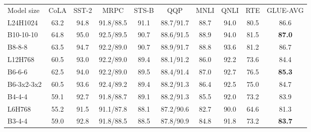 \documentclass{article}
\theoremstyle{custom}
\begin{document}
\begin{table}[!ht]
\centering
\small
\begin{tabular}{@{}lccccccccc@{}}
	\toprule
	Model size & CoLA & SST-2 & MRPC & STS-B & QQP & MNLI & QNLI & RTE & GLUE-AVG \\
	\cmidrule(r){1-1} \cmidrule(lr){2-9} \cmidrule(l){10-10}
	{L24H1024} 
	& 63.2 & 94.8 & 91.8/88.5 & 91.1 & 88.7/91.7 & 88.7 & 94.0 & 80.5 & 86.6 \\
	{B10-10-10} 
	& 64.8 & 95.0 & 92.5/89.5 & 90.7 & 88.6/91.5 & 88.9 & 94.0 & 81.5 & \bf 87.0 \\
	{B8-8-8} 
	& 63.5 & 94.7 & 92.2/89.0 & 90.7 & 88.9/91.7 & 88.8 & 93.6 & 81.2 & 86.7 \\
	\cmidrule(r){1-1} \cmidrule(lr){2-9} \cmidrule(l){10-10}
	{L12H768} 
	& 60.5 & 93.0 & 92.2/89.0 & 89.4 & 88.1/91.2 & 86.0 & 92.2 & 73.6 & 84.4 \\
	{B6-6-6} 
	& 62.5 & 94.0 & 92.2/89.0 & 89.5 & 88.4/91.4 & 87.0 & 92.7 & 76.5 & \bf 85.3 \\
	{B6-3x2-3x2} 
	& 60.5 & 93.6 & 92.4/89.2 & 89.4 & 88.2/91.3 & 86.4 & 92.5 & 75.0 & 84.7 \\
	{B4-4-4} 
	& 59.1 & 92.7 & 91.8/88.7 & 89.1 & 88.2/91.3 & 85.5 & 92.0 & 73.2 & 83.9 \\
	\cmidrule(r){1-1} \cmidrule(lr){2-9} \cmidrule(l){10-10}
	{L6H768} 
	& 55.2 & 91.5 & 91.1/87.8 & 88.1 & 87.2/90.6 & 82.7 & 90.0 & 64.6 & 81.3 \\
	{B3-4-4} 
	& 59.0 & 92.8 & 91.8/88.5 & 88.5 & 87.8/90.9 & 84.8 & 91.8 & 73.2 & \bf 83.7 \\
	\bottomrule
\end{tabular}

\vspace{0.1em}


\end{table}
\end{document}
